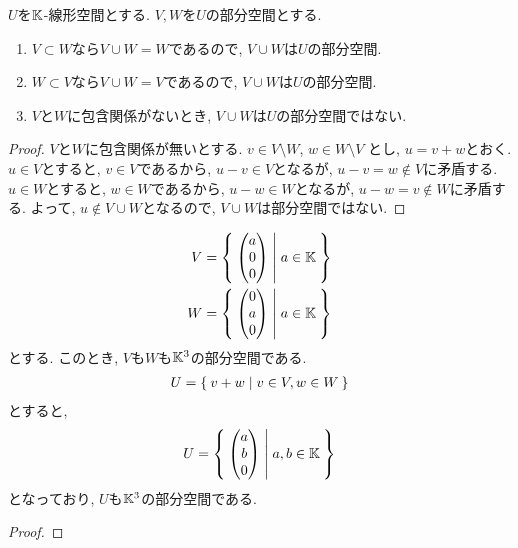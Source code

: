 \begin{example}
  $U$を$\mathbb{K}$-線形空間とする.
  $V, W$を$U$の部分空間とする.
  \begin{enumerate}
    \item $V\subset W$なら$V\cup W=W$であるので, $V\cup W$は$U$の部分空間.
    \item $W\subset V$なら$V\cup W=V$であるので, $V\cup W$は$U$の部分空間.
    \item $V$と$W$に包含関係がないとき, $V\cup W$は$U$の部分空間ではない. 
  \end{enumerate}
\end{example}
\begin{proof}
  $V$と$W$に包含関係が無いとする.
  $v\in V\setminus W$, $w\in W\setminus V$
  とし, $u=v+w$とおく.
  $u\in V$とすると, $v\in V$であるから, $u-v\in V$となるが,
  $u-v=w\not\in V$に矛盾する.
  $u\in W$とすると, $w\in W$であるから, $u-w\in W$となるが,
  $u-w=v\not\in W$に矛盾する.
  よって, $u\not\in V\cup W$となるので, $V\cup W$は部分空間ではない.
\end{proof}



\begin{example}
  \begin{align*}
    V&=\Set{\begin{pmatrix}a\\0\\0\end{pmatrix}|a\in\mathbb{K}}\\
    W&=\Set{\begin{pmatrix}0\\a\\0\end{pmatrix}|a\in\mathbb{K}}
  \end{align*}
  とする.
  このとき, $V$も$W$も$\mathbb{K}^3$の部分空間である.
  \begin{align*}
    U=\Set{v+w|v\in V, w\in W}
  \end{align*}
  とすると,
  \begin{align*}
    U&=\Set{\begin{pmatrix}a\\b\\0\end{pmatrix}|a,b\in\mathbb{K}}\\
  \end{align*}
  となっており, $U$も$\mathbb{K}^3$の部分空間である.
\end{example}
\begin{proof}\end{proof}

